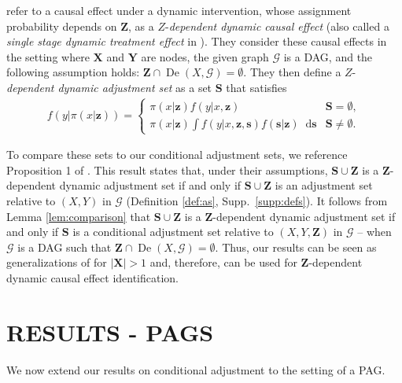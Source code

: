 \documentclass[twoside]{article}
\DeclareMathOperator{\De}{De}
\newcommand{\mb}[1]{\mathbf{#1}}
\newcommand{\g}[1][G]{\mathcal{#1}}
\newcommand*\diff{\mathop{}\!\mathrm{d}}
\begin{document}
\cite{smucler2020efficient} refer to a causal effect under a dynamic intervention, whose assignment probability depends on $\mb{Z}$, as a $\boldsymbol{\mathit{Z}}$-\textit{dependent dynamic causal effect} (also called a \textit{single stage dynamic treatment effect} in \cite{chakraborty2013statistical}). They consider these causal effects in the setting where $\mb{X}$ and $\mb{Y}$ are nodes, the given graph $\g$ is a DAG, and the following assumption holds: $\mb{Z} \cap \De(X,\g) = \emptyset$. They then define a $\boldsymbol{\mathit{Z}}$-\textit{dependent dynamic adjustment set} as a set $\mb{S}$ that satisfies
\begin{align*} 
    f(y|\pi(x | \mb{z})) = 
    \begin{cases} 
          \pi(x|\mb{z})f(y | x, \mb{z}) & \mb{S}=\emptyset, \\
          \pi(x|\mb{z}) \int f(y | x, \mb{z}, \mb{s}) f(\mb{s}|\mb{z}) \diff \mb{s} & \mb{S}\neq\emptyset.
    \end{cases}
    \end{align*}

To compare these sets to our conditional adjustment sets, we reference Proposition 1 of \cite{smucler2020efficient}. This result states that, under their assumptions, $\mb{S}\cup \mb{Z}$ is a $\mb{Z}$-dependent dynamic adjustment set if and only if $\mb{S} \cup \mb{Z}$ is an adjustment set relative to $(X,Y)$ in $\g$ (Definition \ref{def:as}, Supp.\ \ref{supp:defs}). It follows from Lemma \ref{lem:comparison} that $\mb{S} \cup \mb{Z}$ is a $\mb{Z}$-dependent dynamic adjustment set if and only if $\mb{S}$ is a conditional adjustment set relative to $(X,Y,\mb{Z})$ in $\g$ -- when $\g$ is a DAG such that $\mb{Z} \cap \De(X,\g) = \emptyset$. Thus, our results can be seen as generalizations of \cite{smucler2020efficient} for $|\mb{X}| >1$ and, therefore, can be used for $\mb{Z}$-dependent dynamic causal effect identification. 








\section{RESULTS - PAGS}
\label{sec:pags}
We now extend our results on conditional adjustment to the setting of a PAG.
\end{document}
